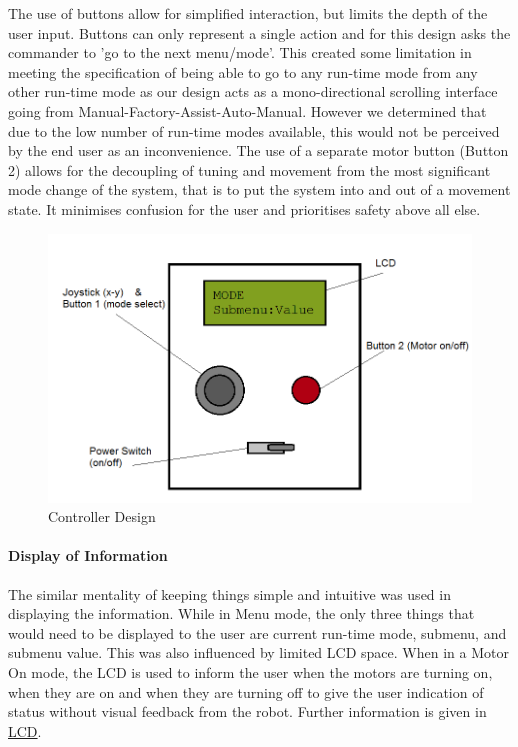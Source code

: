 \documentclass{article}
\begin{document}
	The use of buttons allow for simplified interaction, but limits the depth of the user input. Buttons can only represent a single action and for this design asks the commander to 'go to the next menu/mode'. This created some limitation in meeting the specification of being able to go to any run-time mode from any other run-time mode as our design acts as a mono-directional scrolling interface going from Manual-Factory-Assist-Auto-Manual. However we determined that due to the low number of run-time modes available, this would not be perceived by the end user as an inconvenience. The use of a separate motor button (Button 2) allows for the decoupling of tuning and movement from the most significant mode change of the system, that is to put the system into and out of a movement state. It minimises confusion for the user and prioritises safety above all else.
	
	\begin{figure}[h]
	\includegraphics[scale=0.45]{ControllerDesign.png}
	\centering
	\caption{Controller Design}
	\end{figure}
	
	\paragraph{Display of Information}
	The similar mentality of keeping things simple and intuitive was used in displaying the information. While in Menu mode, the only three things that would need to be displayed to the user are current run-time mode, submenu, and submenu value. This was also influenced by limited LCD space. When in a Motor On mode, the LCD is used to inform the user when the motors are turning on, when they are on and when they are turning off to give the user indication of status without visual feedback from the robot. Further information is given in \underline{LCD}.
	
\end{document}

